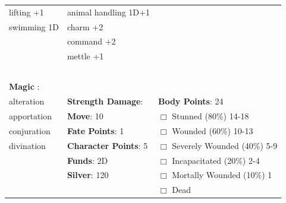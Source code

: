 \documentclass[10pt]{article}
\begin{document}
\begin{table}
\begin{tabular}{m{156pt} m{156pt} m{156pt}}
lifting           +1 \hrulefill & animal handling 1D+1 \hrulefill &  \hrulefill \\

swimming          1D \hrulefill & charm             +2 \hrulefill &  \hrulefill \\

 \hrulefill & command           +2 \hrulefill &  \hrulefill \\

 \hrulefill & mettle            +1 \hrulefill &  \hrulefill \\

 \hrulefill &  \hrulefill &  \hrulefill \\

 \hrulefill &  \hrulefill &  \hrulefill \\

 \hrulefill &  \hrulefill &  \hrulefill \\

 \hrulefill &  \hrulefill &  \hrulefill \\

                                  &                                 &                             \\
\textbf{Magic }:  \hrulefill  &                                 &                             \\
alteration           \hrulefill & \textbf{Strength Damage}:  \hrulefill                             & \textbf{Body Points}: 24 \hrulefill \\
apportation          \hrulefill                        & \textbf{Move}:             10             \hrulefill    & $\Box$ Stunned \footnotesize{(80\%)} \hfill 14-18 \\
conjuration          \hrulefill                        & \textbf{Fate Points}:      1      \hrulefill    & $\Box$ Wounded \footnotesize{(60\%)} \hfill 10-13 \\
divination           \hrulefill                        & \textbf{Character Points}: 5 \hrulefill    & $\Box$ Severely Wounded \footnotesize{(40\%)} \hfill 5-9 \\
 \hrulefill                        & \textbf{Funds}:            2D            \hrulefill    & $\Box$ Incapacitated \footnotesize{(20\%)} \hfill 2-4 \\
 \hrulefill                        & \textbf{Silver}:           120           \hrulefill    & $\Box$ Mortally Wounded \footnotesize{(10\%)} \hfill 1 \\
 \hrulefill                        &  \hrulefill                                                       & $\Box$ Dead   \\
\end{tabular}
\end{table}
\cleardoublepage
\end{document}
